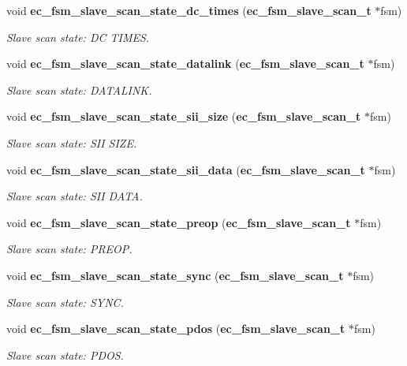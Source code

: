 \begin{DoxyCompactItemize}
void {\bf ec\-\_\-fsm\-\_\-slave\-\_\-scan\-\_\-state\-\_\-dc\-\_\-times} ({\bf ec\-\_\-fsm\-\_\-slave\-\_\-scan\-\_\-t} $\ast$fsm)
\begin{DoxyCompactList}\small\item\em \-Slave scan state\-: \-D\-C \-T\-I\-M\-E\-S. \end{DoxyCompactList}\item 
void {\bf ec\-\_\-fsm\-\_\-slave\-\_\-scan\-\_\-state\-\_\-datalink} ({\bf ec\-\_\-fsm\-\_\-slave\-\_\-scan\-\_\-t} $\ast$fsm)
\begin{DoxyCompactList}\small\item\em \-Slave scan state\-: \-D\-A\-T\-A\-L\-I\-N\-K. \end{DoxyCompactList}\item 
void {\bf ec\-\_\-fsm\-\_\-slave\-\_\-scan\-\_\-state\-\_\-sii\-\_\-size} ({\bf ec\-\_\-fsm\-\_\-slave\-\_\-scan\-\_\-t} $\ast$fsm)
\begin{DoxyCompactList}\small\item\em \-Slave scan state\-: \-S\-I\-I \-S\-I\-Z\-E. \end{DoxyCompactList}\item 
void {\bf ec\-\_\-fsm\-\_\-slave\-\_\-scan\-\_\-state\-\_\-sii\-\_\-data} ({\bf ec\-\_\-fsm\-\_\-slave\-\_\-scan\-\_\-t} $\ast$fsm)
\begin{DoxyCompactList}\small\item\em \-Slave scan state\-: \-S\-I\-I \-D\-A\-T\-A. \end{DoxyCompactList}\item 
void {\bf ec\-\_\-fsm\-\_\-slave\-\_\-scan\-\_\-state\-\_\-preop} ({\bf ec\-\_\-fsm\-\_\-slave\-\_\-scan\-\_\-t} $\ast$fsm)
\begin{DoxyCompactList}\small\item\em \-Slave scan state\-: \-P\-R\-E\-O\-P. \end{DoxyCompactList}\item 
void {\bf ec\-\_\-fsm\-\_\-slave\-\_\-scan\-\_\-state\-\_\-sync} ({\bf ec\-\_\-fsm\-\_\-slave\-\_\-scan\-\_\-t} $\ast$fsm)
\begin{DoxyCompactList}\small\item\em \-Slave scan state\-: \-S\-Y\-N\-C. \end{DoxyCompactList}\item 
void {\bf ec\-\_\-fsm\-\_\-slave\-\_\-scan\-\_\-state\-\_\-pdos} ({\bf ec\-\_\-fsm\-\_\-slave\-\_\-scan\-\_\-t} $\ast$fsm)
\begin{DoxyCompactList}\small\item\em \-Slave scan state\-: \-P\-D\-O\-S. \end{DoxyCompactList}\item 

\end{DoxyCompactItemize}
